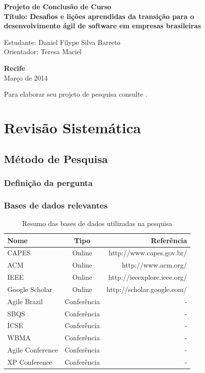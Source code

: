 \documentclass[a4paper,11pt]{article}
\begin{document}
\begin{center}
{\Large \bf  Projeto de Conclusão de Curso}\\[1cm]
{\Large \bf Título: Desafios e lições aprendidas da transição para o desenvolvimento ágil de software em empresas brasileiras} \\[3cm]
\end{center}
{\Large  Estudante: Daniel Filype Silva Barreto}\\[6mm]
{\Large  Orientador: Teresa Maciel}\\[6mm]
\vspace{3.0cm}
\begin{center}
{\large {\bf Recife}\\[6mm]
Março de 2014}
\end{center}

\newpage
\pagestyle {plain}
\setcounter{page}{0} 

Para elaborar seu projeto de pesquisa consulte \cite{Silva05}. 

\section{Revisão Sistemática}
	\subsection{Método de Pesquisa}
		\subsubsection{Definição da pergunta}
		\subsubsection{Bases de dados relevantes}
			\begin{table}[h]
				\centering
				\begin{tabular}{ | l | c | r | } \hline \textbf{Nome} & \textbf{Tipo} & \textbf{Referência} \\ \hline
					CAPES & Online & http://www.capes.gov.br/ \\ \hline
					ACM & Online & http://www.acm.org/ \\ \hline
					IEEE & Online & http://ieeexplore.ieee.org/ \\ \hline
					Google Scholar & Online & http://scholar.google.com/ \\ \hline
					Agile Brazil & Conferência & - \\ \hline
					SBQS & Conferência & - \\ \hline
					ICSE & Conferência & - \\ \hline
					WBMA & Conferência & - \\ \hline
					Agile Conference & Conferência & - \\ \hline
					XP Conference & Conferência & - \\ \hline
				\end{tabular}
				\caption{Resumo das bases de dados utilizadas na pesquisa}
				\label{tab:basesDeDados}
			\end{table}
\end{document}
